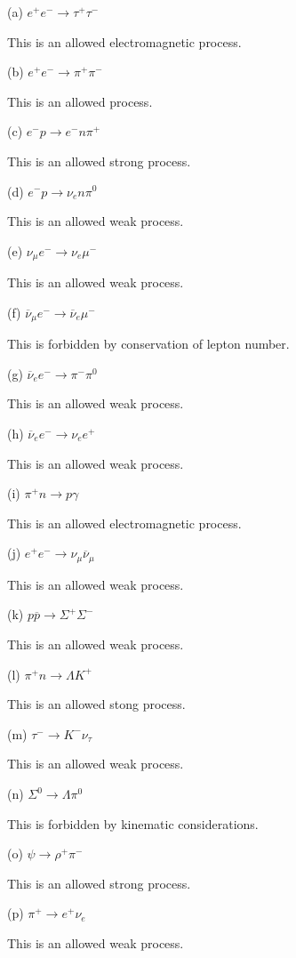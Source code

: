(a) $e^{+}e^{-} \rightarrow \tau^{+}\tau^{-}$

This is an allowed electromagnetic process.

(b) $e^{+}e^{-} \rightarrow \pi^{+}\pi^{-}$

This is an allowed process.

(c) $e^{-}p \rightarrow e^{-}n\pi^{+}$ 

This is an allowed strong process.

(d) $e^{-}p \rightarrow \nu_{e}n\pi^{0}$

This is an allowed weak process.

(e) $\nu_{\mu}e^{-} \rightarrow \nu_{e}\mu^{-}$

This is an allowed weak process.

(f) $\overline{\nu}_{\mu}e^{-} \rightarrow \overline{\nu}_{e}\mu^{-}$

This is forbidden by conservation of lepton number.

(g) $\overline{\nu}_{e}e^{-} \rightarrow \pi^{-}\pi^{0}$

This is an allowed weak process.

(h) $\overline{\nu}_{e}e^{-} \rightarrow \nu_{e}e^{+}$ 

This is an allowed weak process.

(i) $\pi^{+}n \rightarrow p\gamma$

This is an allowed electromagnetic process.

(j) $e^{+}e^{-} \rightarrow \nu_{\mu}\overline{\nu}_{\mu}$

This is an allowed weak process.

(k) $p\overline{p} \rightarrow \Sigma^{+}\Sigma^{-}$

This is an allowed weak process.

(l) $\pi^{+}n \rightarrow \Lambda K^{+}$

This is an allowed stong process.

(m) $\tau^{-} \rightarrow K^{-}\nu_{\tau}$

This is an allowed weak process.

(n) $\Sigma^{0} \rightarrow \Lambda \pi^{0}$

This is forbidden by kinematic considerations.

(o) $\psi \rightarrow \rho^{+}\pi^{-}$

This is an allowed strong process.

(p) $\pi^{+} \rightarrow e^{+}\nu_{e}$

This is an allowed weak process.

